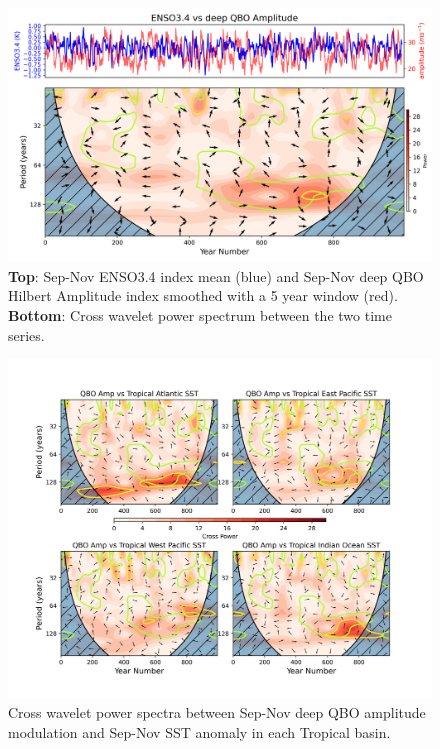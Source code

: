 \documentclass[wcd, manuscript]{copernicus}
\providecommand{\DIFaddbeginFL}{} %
\providecommand{\DIFaddendFL}{} %
\providecommand{\DIFdelbeginFL}{} %
\providecommand{\DIFdelendFL}{} %
\begin{document}
\begin{center}
\begin{figure}[h!]
\DIFdelbeginFL %
\DIFdelendFL \DIFaddbeginFL \includegraphics[width = 0.8\linewidth]{new_changed_figures/cross_power_ENSO_vs_deep_QBO_amp_5yr_mean_new_levels.png}
\DIFaddendFL \caption{\textbf{Top}: Sep-Nov ENSO3.4 index  mean (blue) and Sep-Nov deep QBO Hilbert Amplitude index smoothed with a 5 year window (red). \textbf{Bottom}: Cross wavelet power spectrum between the two time series.}
\label{fig1}
\end{figure}
\end{center}

\begin{center}
\begin{figure}[h!]
\DIFdelbeginFL %
\DIFdelendFL \DIFaddbeginFL \includegraphics[width = \linewidth]{new_changed_figures/QBO_amp_vs_trop_SSTs_crosspower_new_levels.png}
\DIFaddendFL \caption{Cross wavelet power spectra between Sep-Nov deep QBO amplitude modulation and Sep-Nov SST anomaly in each Tropical basin.}
\label{fig1}
\end{figure}
\end{center}
\end{document}
